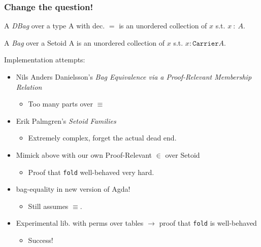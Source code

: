 \documentclass[serif,mathserif,professionalfont,10pt]{beamer}
\begin{document}
\begin{frame}
\frametitle{Change the question!}
\begin{definition}
A \emph{DBag} over a type A with dec. $=$ is an unordered
collection of $x$ s.t. $x~:~A$.
\end{definition}
\pause
\begin{definition}
A \emph{Bag} over a Setoid A is an unordered
collection of $x$ s.t. $x : \texttt{Carrier} A$.
\end{definition}
\pause
Implementation attempts:
\begin{itemize}
\item<4->Nils Anders Danielsson's
\textit{Bag Equivalence via a Proof-Relevant Membership Relation}
\begin{itemize}
\item<5->Too many parts over $\equiv$
\end{itemize}
\item<6->Erik Palmgren's \textit{Setoid Families}
\begin{itemize}
\item<7->Extremely complex, forget the actual dead end.
\end{itemize}
\item<8->Mimick above with our own Proof-Relevant $\in$ over
  Setoid
\begin{itemize}
\item<9->Proof that \texttt{fold} well-behaved very hard.
\end{itemize}
\item<10->bag-equality in new version of Agda!
\begin{itemize}
\item<11->Still assumes $\equiv$.
\end{itemize}
\item<12->Experimental lib. with perms over tables
$\rightarrow$ proof that \texttt{fold} is well-behaved
\begin{itemize}
\item<13->Success!
\end{itemize}
\end{itemize}
\end{frame}
\end{document}
